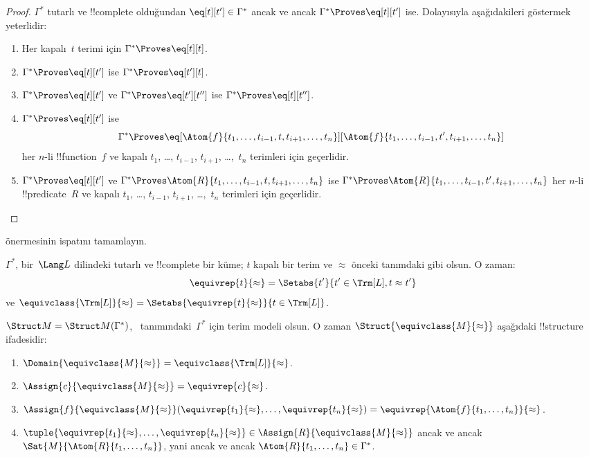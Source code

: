 \begin{proof}
$\Gamma^*$ tutarlı ve !!{complete} olduğundan $\eq[t][t']\in\Gamma^*$
ancak ve ancak $\Gamma^*\Proves\eq[t][t']$ ise. Dolayısıyla
aşağıdakileri göstermek yeterlidir:
\begin{enumerate}
\item Her kapalı~$t$ terimi için $\Gamma^*\Proves\eq[t][t]$.
\item $\Gamma^*\Proves\eq[t][t']$ ise $\Gamma^*\Proves\eq[t'][t]$.
\item $\Gamma^*\Proves\eq[t][t']$ ve $\Gamma^*\Proves\eq[t'][t'']$
  ise $\Gamma^*\Proves\eq[t][t'']$.
\item $\Gamma^*\Proves\eq[t][t']$ ise
\[
\Gamma^* \Proves
\eq[\Atom{f}{t_1,\dots,t_{i-1},t,t_{i+1},\dots,t_n}][\Atom{f}{t_1,\dots,t_{i-1},t',t_{i+1},\dots,t_n}]
\]
her $n$-li !!{function}~$f$ ve kapalı $t_1$, \dots, $t_{i-1}$,
$t_{i+1}$, \dots,~$t_n$ terimleri için geçerlidir.
\item $\Gamma^*\Proves\eq[t][t']$ ve
$\Gamma^*\Proves\Atom{R}{t_1,\dots,t_{i-1},t,t_{i+1},\dots,t_n}$ ise
$\Gamma^*\Proves\Atom{R}{t_1,\dots,t_{i-1},t',t_{i+1},\dots,t_n}$
her $n$-li !!{predicate}~$R$ ve kapalı $t_1$, \dots, $t_{i-1}$,
$t_{i+1}$, \dots,~$t_n$ terimleri için geçerlidir.
\end{enumerate}
\end{proof}

\begin{prob}
 önermesinin ispatını tamamlayın.
\end{prob}

\begin{defn}
$\Gamma^*$, bir~$\Lang L$ dilindeki tutarlı ve !!{complete} bir küme;
$t$ kapalı bir terim ve $\approx$ önceki tanımdaki gibi olsun. O zaman:
\[
\equivrep{t}{\approx} = \Setabs{t'}{t'\in \Trm[L], t \approx t'}
\]
ve
$\equivclass{\Trm[L]}{\approx}=\Setabs{\equivrep{t}{\approx}}{t\in\Trm[L]}$.
\end{defn}

\begin{defn}
$\Struct M=\Struct M(\Gamma^*)$,~
tanımındaki~$\Gamma^*$ için terim modeli olsun. O zaman
$\Struct{\equivclass{M}{\approx}}$ aşağıdaki !!{structure} ifadesidir:
\begin{enumerate}
\item $\Domain{\equivclass{M}{\approx}}=\equivclass{\Trm[L]}{\approx}$.
\item $\Assign{c}{\equivclass{M}{\approx}}=\equivrep{c}{\approx}$.
\item $\Assign{f}{\equivclass{M}{\approx}}(\equivrep{t_1}{\approx},\dots,
  \equivrep{t_n}{\approx})=\equivrep{\Atom{f}{t_1,\dots,t_n}}{\approx}$.
\item $\tuple{\equivrep{t_1}{\approx},\dots,\equivrep{t_n}{\approx}}
  \in\Assign{R}{\equivclass{M}{\approx}}$ ancak ve ancak
  $\Sat{M}{\Atom{R}{t_1,\dots,t_n}}$, yani ancak ve ancak
  $\Atom{R}{t_1,\dots,t_n}\in\Gamma^*$.
\end{enumerate}
\end{defn}

